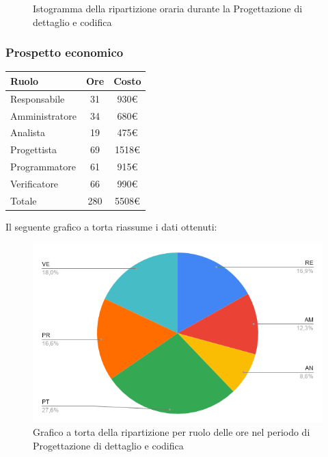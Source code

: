 {{{{{{{{{{{{{{{{\begin{figure}[!h]
\begin{center}
						\caption{Istogramma della ripartizione oraria durante la Progettazione di
							dettaglio e codifica}
					\end{center}
				\end{figure}
				\clearpage
				\subsubsection{Prospetto economico}\label{PreventivoFaseDiProgettazioneDiDettaglioECodificaProspettoEconomico}
				\quad
				\def\tabularxcolumn#1{m{#1}}
				{
					\begin{center}
						\renewcommand{\arraystretch}{1.4}
						\begin{tabularx}{7cm}{|X|c|c|}
							\hline
							\rowcolor{airforceblue}
							\textbf{Ruolo} & \textbf{Ore} & \textbf{Costo}\\
							\hline
							Responsabile & 31 & 930\euro\\
							\hline
							Amministratore & 34 & 680\euro\\
							\hline
							Analista & 19 & 475\euro\\
							\hline
							Progettista & 69 & 1518\euro\\
							\hline
							Programmatore & 61 & 915\euro\\
							\hline
							Verificatore & 66 & 990\euro\\
							\hline
							Totale & 280 & 5508\euro\\
							\hline
						\end{tabularx}
					\end{center}
					
					Il seguente grafico a torta riassume i dati ottenuti:
					\begin{figure}[!ht]
						\begin{center}
							\includegraphics[width=0.8\linewidth]{../immagini/pdp/torta_progettazione_dettaglio.png}
							\caption{Grafico a torta della ripartizione per ruolo delle ore nel periodo di Progettazione
								di dettaglio e codifica}
						\end{center}
					\end{figure}

}}}}}}}}}}}}}}}}}
